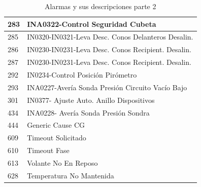 \documentclass[10pt]{article}
\begin{document}
\begin{table}[!ht]
\begin{tabular}{|l|l|}
        283 & INA0322-Control Seguridad Cubeta \\ \hline
        285 & IN0320-IN0321-Leva Desc. Conos Delanteros Desalin. \\ \hline
        286 & IN0230-IN0231-Leva Desc. Conos Recipient. Desalin. \\ \hline
        287 & IN0230-IN0231-Leva Desc. Conos Recipient. Desalin. \\ \hline
        292 & IN0234-Control Posición Pirómetro \\ \hline
        293 & INA0227-Avería Sonda Presión Circuito Vací­o Bajo \\ \hline
        301 & IN0377- Ajuste Auto. Anillo Dispositivos \\ \hline
        434 & INA0228- Averí­a Sonda Presión Sondra \\ \hline
        444 & Generic Cause CG \\ \hline
        609 & Timeout Solicitado \\ \hline
        610 & Timeout Fase \\ \hline
        613 & Volante No En Reposo \\ \hline
        628 & Temperatura No Mantenida \\ \hline
    \end{tabular}
     \caption{Alarmas y sus descripciones parte 2}
\end{table}


\newpage
\end{document}
